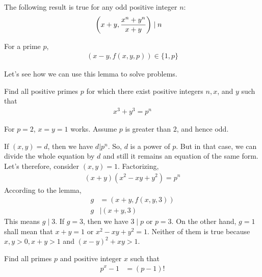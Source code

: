 	\begin{corollary}
		The following result is true for any odd positive integer $n$:
		\begin{align*}
			\left(x+y,\frac{x^n+y^n}{x+y}\right)
				& \mid n
		\end{align*}
	\end{corollary}

	\begin{corollary}
		For a prime $p$,
		\begin{align*}
			(x-y,f(x,y,p))\in\{1,p\}
		\end{align*}
	\end{corollary}

Let's see how we can use this lemma to solve problems.

	\begin{problem}[Hungary 2000]
		Find all positive primes $p$ for which there exist positive
		integers $n,x$, and $y$ such that
		\begin{align*}
			x^3+y^3=p^n
		\end{align*}
	\end{problem}

	\begin{solution}
		For $p=2$, $x=y=1$ works. Assume $p$ is greater than $2$, and hence odd.

		If $(x, y)=d$, then we have $d|p^n$. So, $d$ is a power of $p$. But in that case, we can divide the whole equation by $d$ and still it remains an equation of the same form. Let's therefore, consider $(x, y)=1$. Factorizing,
		\begin{align*}
			(x+y)(x^2-xy+y^2)=p^n
		\end{align*}
		According to the lemma,
		\begin{align*}
			g
				& =\left(x+y, f(x, y, 3)\right)\\
			g
				& \mid (x+y,3)
		\end{align*}
		This means $g\mid 3$. If $g=3$, then we have $3\mid p$ or $p=3$. On the other hand, $g=1$ shall mean that $x+y=1$ or $x^2-xy+y^2=1$. Neither of them is true because $x,y>0,x+y>1$ and $(x-y)^2+xy>1$.
	\end{solution}

	\begin{problem}
		Find all primes $p$ and positive integer $x$ such that
			\begin{align*}
				p^x-1 & = (p-1)!
			\end{align*}
	\end{problem}

